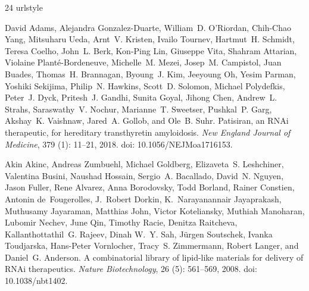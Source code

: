 \documentclass{article}
\begin{document}
\begin{thebibliography}{24}
\providecommand{\natexlab}[1]{#1}
\providecommand{\url}[1]{\texttt{#1}}
\expandafter\ifx\csname urlstyle\endcsname\relax
  \providecommand{\doi}[1]{doi: #1}\else
  \providecommand{\doi}{doi: \begingroup \urlstyle{rm}\Url}\fi

David Adams, Alejandra Gonzalez-Duarte, William~D. O'Riordan, Chih-Chao Yang,
  Mitsuharu Ueda, Arnt~V. Kristen, Ivailo Tournev, Hartmut~H. Schmidt, Teresa
  Coelho, John~L. Berk, Kon-Ping Lin, Giuseppe Vita, Shahram Attarian, Violaine
  Plant\'{e}-Bordeneuve, Michelle~M. Mezei, Josep~M. Campistol, Juan Buades,
  Thomas~H. Brannagan, Byoung~J. Kim, Jeeyoung Oh, Yesim Parman, Yoshiki
  Sekijima, Philip~N. Hawkins, Scott~D. Solomon, Michael Polydefkis, Peter~J.
  Dyck, Pritesh~J. Gandhi, Sunita Goyal, Jihong Chen, Andrew~L. Strahs,
  Saraswathy~V. Nochur, Marianne~T. Sweetser, Pushkal~P. Garg, Akshay~K.
  Vaishnaw, Jared~A. Gollob, and Ole~B. Suhr.
\newblock Patisiran, an {RNAi} therapeutic, for hereditary transthyretin
  amyloidosis.
\newblock \emph{New England Journal of Medicine}, 379 (1):
  11--21, 2018.
\newblock \doi{10.1056/NEJMoa1716153}.

Akin Akinc, Andreas Zumbuehl, Michael Goldberg, Elizaveta~S. Leshchiner,
  Valentina Busini, Naushad Hossain, Sergio~A. Bacallado, David~N. Nguyen,
  Jason Fuller, Rene Alvarez, Anna Borodovsky, Todd Borland, Rainer Constien,
  Antonin de~Fougerolles, J.~Robert Dorkin, K.~{Narayanannair Jayaprakash},
  Muthusamy Jayaraman, Matthias John, Victor Koteliansky, Muthiah Manoharan,
  Lubomir Nechev, June Qin, Timothy Racie, Denitza Raitcheva,
  Kallanthottathil~G. Rajeev, Dinah W.~Y. Sah, J\"{u}rgen Soutschek, Ivanka
  Toudjarska, Hans-Peter Vornlocher, Tracy~S. Zimmermann, Robert Langer, and
  Daniel~G. Anderson.
\newblock A combinatorial library of lipid-like materials for delivery of
  {RNAi} therapeutics.
\newblock \emph{Nature Biotechnology}, 26 (5): 561--569,
  2008.
\newblock \doi{10.1038/nbt1402}.


\end{thebibliography}
\end{document}
